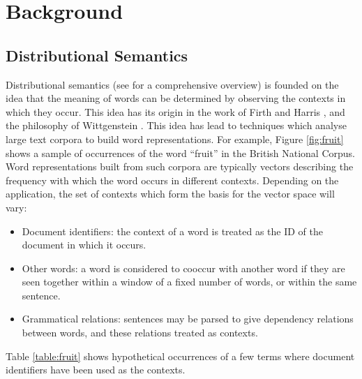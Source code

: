 \documentclass[preprint,leqno]{elsarticle}
\begin{document}

\section{Background}

\subsection{Distributional Semantics}

Distributional semantics (see \cite{Turney:10} for a comprehensive
overview) is founded on the idea that the meaning of words can be
determined by observing the contexts in which they occur. This idea
has its origin in the work of Firth \cite{Firth:57} and Harris
\cite{Harris:68}, and the philosophy of Wittgenstein
\cite{Wittgenstein:53}. This idea has lead to techniques which analyse
large text corpora to build word representations. For example, Figure
\ref{fig:fruit} shows a sample of occurrences of the word ``fruit'' in
the British National Corpus. Word representations built from such
corpora are typically vectors describing the frequency with which the
word occurs in different contexts. Depending on the application, the
set of contexts which form the basis for the vector space will vary:
\begin{itemize}
\item Document identifiers: the context of a word is treated as the ID
  of the document in which it occurs.
\item Other words: a word is considered to cooccur with another word
  if they are seen together within a window of a fixed number of
  words, or within the same sentence.
\item Grammatical relations: sentences may be parsed to give
  dependency relations between words, and these relations treated as
  contexts.
\end{itemize}
Table \ref{table:fruit} shows hypothetical occurrences of a few terms
where document identifiers have been used as the contexts.
\end{document}
